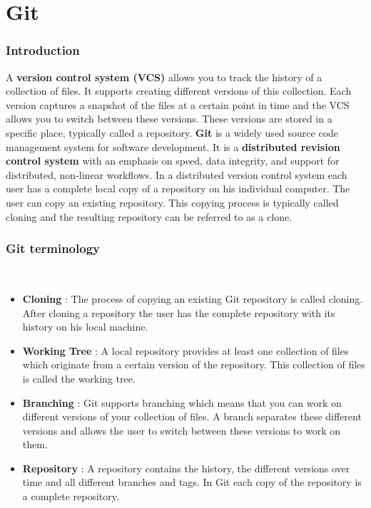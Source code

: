\documentclass{beamer}
\begin{document}
\section{Git}
\begin{frame}
\frametitle{Introduction}

A \textbf{version control system (VCS)} allows you to track the history of a collection of files. It supports creating different versions of this collection. Each version captures a snapshot of the files at a certain point in time and the VCS allows you to switch between these versions. These versions are stored in a specific place, typically called a repository.
	\textbf{Git} is a widely used source code management system for software development. It is a \textbf{distributed revision control system} with an emphasis on speed, data integrity, and support for distributed, non-linear workflows. In a distributed version control system each user has a complete local copy of a repository on his individual computer. The user can copy an existing repository. This copying process is typically called cloning and the resulting repository can be referred to as a clone.
\end{frame}



\begin{frame}
\frametitle{Git terminology}\
\begin{itemize}
	    \item \textbf{Cloning} : The process of copying an existing Git repository is called cloning. After cloning a repository the user has the complete repository with its history on his local machine. 
	    \item \textbf{Working Tree} : A local repository provides at least one collection of files which originate from a certain version of the repository. This collection of files is called the working tree.
	    \item \textbf{Branching} : Git supports branching which means that you can work on different versions of your collection of files. A branch separates these different versions and allows the user to switch between these versions to work on them.
	    \item \textbf{Repository} : A repository contains the history, the different versions over time and all different branches and tags. In Git each copy of the repository is a complete repository.
	\end{itemize}

\end{frame}
\end{document}
